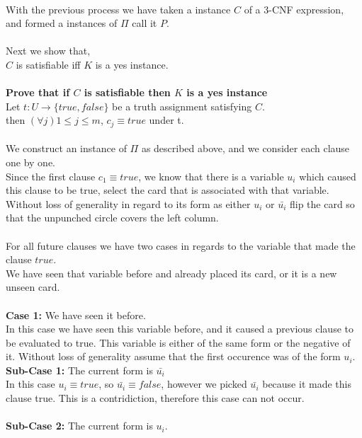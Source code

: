 \documentclass{article}
\begin{document}
      \\
      With the previous process we have taken a instance $C$ of a 3-CNF expression, and formed a instances of $\Pi$ call it $P$.\\
      \\
      Next we show that,\\
      \indent $C$ is satisfiable iff $K$ is a yes instance.\\
      \\
      \textbf{Prove that if $C$ is satisfiable then $K$ is a yes instance}\\
      Let $t:U \rightarrow \{true, false\}$ be a truth assignment satisfying $C$.\\
      then $(\forall j) 1 \leq j \leq m$, $c_{j} \equiv true$ under t.\\
      \\
      We construct an instance of $\Pi$ as described above, and we consider each clause one by one.\\
      Since the first clause $c_{1} \equiv true$, we know that there is a variable $u_{i}$ which caused this clause to be true, select the card that is associated with that variable.
      Without loss of generality in regard to its form as either $u_{i}$ or $\bar{u_{i}}$ flip the card so that the unpunched circle covers the left column.\\
      \\
      For all future clauses we have two cases in regards to the variable that made the clause $true$.\\
      We have seen that variable before and already placed its card, or it is a new unseen card.\\
      \\
      \textbf{Case 1:} We have seen it before.\\
      In this case we have seen this variable before, and it caused a previous clause to be evaluated to true.
      This variable is either of the same form or the negative of it. Without loss of generality assume that the first occurence was of the form $u_{i}$.\\
      \textbf{Sub-Case 1:} The current form is $\bar{u_{i}}$\\
      \indent In this case $u_{i} \equiv true$, so $\bar{u_{i}} \equiv false$, however we picked $\bar{u_{i}}$ because it made this clause true. This is a contridiction, therefore this case can not occur.\\
      \\
      \textbf{Sub-Case 2:} The current form is $u_{i}$.\\
\end{document}
